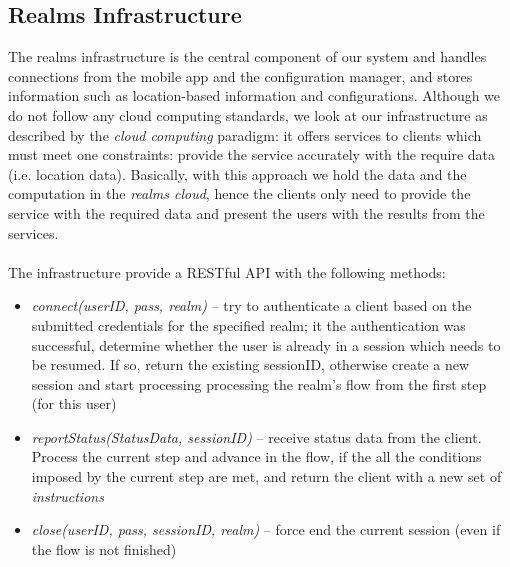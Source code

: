 \subsection{Realms Infrastructure} %
\label{sub:realms_infrastructure}
The realms infrastructure is the central component of our system and handles connections from the mobile app and the configuration manager, and stores information such as location-based information and configurations. Although we do not follow any cloud computing standards, we look at our infrastructure as described by the \emph{cloud computing} paradigm: it offers services to clients which must meet one constraints: provide the service accurately with the require data (i.e. location data). Basically, with this approach we hold the data and the computation in the \emph{realms cloud}, hence the clients only need to provide the service with the required data and present the users with the results from the services.
\\\\
The infrastructure provide a RESTful API with the following methods:
\begin{itemize}
	\item \emph{connect(userID, pass, realm)} -- try to authenticate a client based on the submitted credentials for the specified realm; it the authentication was successful, determine whether the user is already in a session which needs to be resumed. If so, return the existing sessionID, otherwise create a new session and start processing processing the realm's flow from the first step (for this user)
	\item \emph{reportStatus(StatusData, sessionID)} -- receive status data from the client. Process the current step and advance in the flow, if the all the conditions imposed by the current step are met, and return the client with a new set of \emph{instructions}
	\item \emph{close(userID, pass, sessionID, realm)} -- force end the current session (even if the flow is not finished)
\end{itemize}

